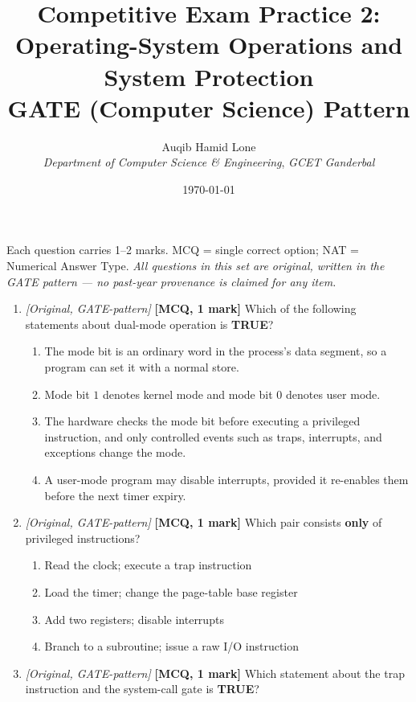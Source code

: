 \documentclass[11pt]{article}
\title{Competitive Exam Practice 2: Operating-System Operations and System Protection\\\large GATE (Computer Science) Pattern}
\author{Auqib Hamid Lone\\[0.3em]
  \emph{Department of Computer Science \& Engineering}, \emph{GCET Ganderbal}}
\date{\today}
\begin{document}
\maketitle

\noindent Each question carries 1--2 marks. MCQ = single correct option; NAT = Numerical Answer Type. \emph{All questions in this set are original, written in the GATE pattern --- no past-year provenance is claimed for any item.}

\begin{enumerate}

\item[\textbf{Q1}] \textit{[Original, GATE-pattern]} \textbf{[MCQ, 1 mark]} Which of the following statements about dual-mode operation is \textbf{TRUE}?

\begin{enumerate}
  \item[(A)] The mode bit is an ordinary word in the process's data segment, so a program can set it with a normal store.
  \item[(B)] Mode bit $1$ denotes kernel mode and mode bit $0$ denotes user mode.
  \item[(C)] The hardware checks the mode bit before executing a privileged instruction, and only controlled events such as traps, interrupts, and exceptions change the mode.
  \item[(D)] A user-mode program may disable interrupts, provided it re-enables them before the next timer expiry.
\end{enumerate}

\item[\textbf{Q2}] \textit{[Original, GATE-pattern]} \textbf{[MCQ, 1 mark]} Which pair consists \textbf{only} of privileged instructions?

\begin{enumerate}
  \item[(A)] Read the clock; execute a trap instruction
  \item[(B)] Load the timer; change the page-table base register
  \item[(C)] Add two registers; disable interrupts
  \item[(D)] Branch to a subroutine; issue a raw I/O instruction
\end{enumerate}

\item[\textbf{Q3}] \textit{[Original, GATE-pattern]} \textbf{[MCQ, 1 mark]} Which statement about the trap instruction and the system-call gate is \textbf{TRUE}?


\end{enumerate}
\end{document}
